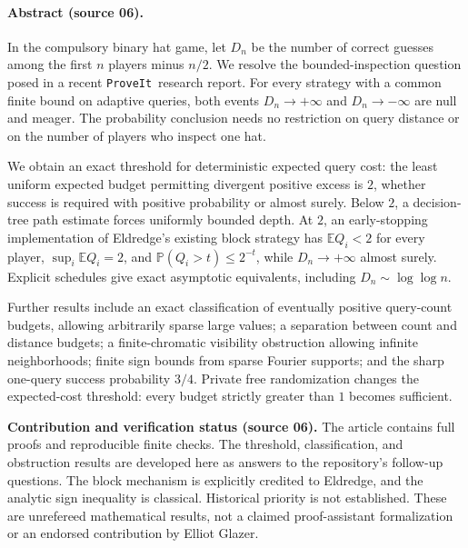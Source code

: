 \documentclass[11pt,letterpaper]{article}
\theoremstyle{definition}
\newcommand{\E}{\mathbb E}
\newcommand{\Prb}{\mathbb P}
\newcommand{\repo}{\texttt{ProveIt}}
\begin{document}
\smallskip
{}

\paragraph{Abstract (source 06).}
In the compulsory binary hat game, let \(D_n\) be the number of correct
guesses among the first \(n\) players minus \(n/2\). We resolve the
bounded-inspection question posed in a recent \repo\ research report.
For every strategy with a common finite bound on adaptive queries,
both events \(D_n\to+\infty\) and \(D_n\to-\infty\) are null and meager.
The probability conclusion needs no restriction on query distance or on
the number of players who inspect one hat.

We obtain an exact threshold for deterministic expected query cost:
the least uniform expected budget permitting divergent positive excess
is \(2\), whether success is required with positive probability or
almost surely. Below \(2\), a decision-tree path estimate forces uniformly
bounded depth. At \(2\), an early-stopping implementation of Eldredge's
existing block strategy has \(\E Q_i<2\) for every player,
\(\sup_i\E Q_i=2\), and \(\Prb(Q_i>t)\le2^{-t}\), while
\(D_n\to+\infty\) almost surely. Explicit schedules give exact asymptotic
equivalents, including \(D_n\sim\log\log n\).

Further results include an exact classification of eventually positive
query-count budgets, allowing arbitrarily sparse large values; a separation between count and
distance budgets; a finite-chromatic visibility obstruction allowing
infinite neighborhoods; finite sign bounds from sparse Fourier supports;
and the sharp one-query success probability \(3/4\). Private free
randomization changes the expected-cost threshold: every budget
strictly greater than \(1\) becomes sufficient.

\begin{resultbox}
\textbf{Contribution and verification status (source 06).}
The article contains full proofs and reproducible finite checks.
The threshold, classification, and obstruction results are developed here
as answers to the repository's follow-up questions. The block mechanism
is explicitly credited to Eldredge, and the analytic sign inequality is
classical. Historical priority is not established. These are unrefereed
mathematical results, not a claimed proof-assistant formalization or an
endorsed contribution by Elliot Glazer.
\end{resultbox}
\end{document}

